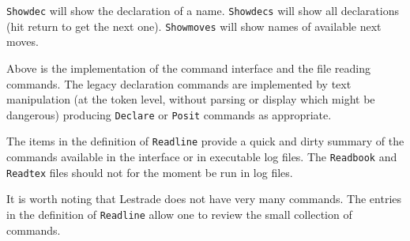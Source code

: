 \documentclass[12pt]{article}
\begin{document}
{\tt Showdec} will show the declaration of a name.  {\tt Showdecs} will show all declarations (hit return to get the next one).  {\tt Showmoves} will
show names of available next moves.

Above  is the implementation of the command interface and the file reading commands.  The legacy declaration commands are implemented by text manipulation (at the token level, without parsing or display which might be dangerous)  producing
{\tt Declare} or {\tt Posit} commands as appropriate.

The items in the definition of {\tt Readline} provide a quick and dirty summary of the commands available in the interface or in executable log files.
The {\tt Readbook} and {\tt Readtex} files should not for the moment be run in log files.

It is worth noting that Lestrade does not have very many commands.  The entries in the definition of {\tt Readline} allow one to review
the small collection of commands.
\end{document}
